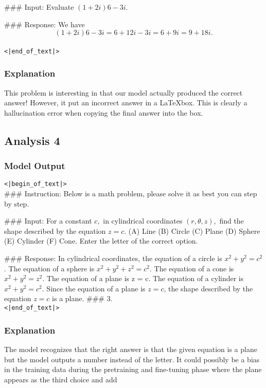 \#\#\# Input: Evaluate $(1+2i)6-3i$. 

\#\#\# Response: We have $$(1+2i)6-3i = 6+12i -3i = 6+9i = \boxed{9+18i}.$$ \\\texttt{<|end\_of\_text|>}

\subsubsection{Explanation}
This problem is interesting in that our model actually produced the correct answer! However, it put an incorrect answer in a \LaTeX box. This is clearly a hallucination error when copying the final answer into the box.

\subsection{Analysis 4}
\subsubsection{Model Output}
\texttt{<|begin\_of\_text|>} \\

\#\#\# Instruction: Below is a math problem, please solve it as best you can step by step. 

\#\#\# Input: For a constant $c,$ in cylindrical coordinates $(r,\theta,z),$ find the shape described by the equation $z = c$. (A) Line (B) Circle (C) Plane (D) Sphere (E) Cylinder (F) Cone. Enter the letter of the correct option. 

\#\#\# Response: In cylindrical coordinates, the equation of a circle is $x^2 + y^2 = c^2$. The equation of a sphere is $x^2 + y^2 + z^2 = c^2$. The equation of a cone is $x^2 + y^2 = z^2$. The equation of a plane is z = c. The equation of a cylinder is $x^2 + y^2 = c^2$. Since the equation of a plane is $z = c$, the shape described by the equation $z = c$ is a plane.
\#\#\# 3. 
\\\texttt{<|end\_of\_text|>}

\subsubsection{Explanation}
The model recognizes that the right answer is that the given equation is a plane but the model outputs a number instead of the letter. It could possibly be a bias in the training data during the pretraining and fine-tuning phase where the plane appears as the third choice and add

